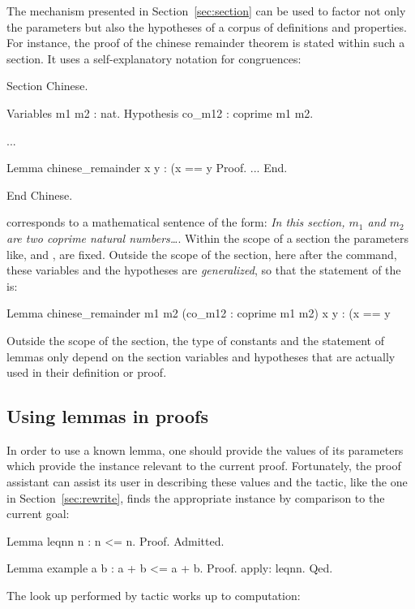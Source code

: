 The  mechanism presented in Section~\ref{sec:section} can
be used to factor not only the parameters but also the hypotheses of a
corpus of definitions and properties. For instance, the proof of the
chinese remainder theorem is stated within such a section. It uses a
self-explanatory notation for congruences:

\begin{coq}{}{}
Section Chinese.

Variables m1 m2 : nat.
Hypothesis co_m12 : coprime m1 m2.

...

Lemma chinese_remainder x y :
  (x == y %
Proof.
...
End.

End Chinese.
\end{coq}
corresponds to a mathematical sentence of the form: \emph{In this section,
  $m_1$ and $m_2$ are two coprime natural numbers\dots}. Within the
scope of a section the parameters like,  and , are
fixed. Outside the scope of the section, here after the
 command, these variables and the hypotheses are
\emph{generalized}, so that the statement of the  is:

\begin{coq}{}{}
Lemma chinese_remainder m1 m2 (co_m12 : coprime m1 m2) x y :
  (x == y %
\end{coq}

Outside the scope of the section, the type of constants and the
statement of lemmas only depend on the section variables and
hypotheses that are actually used in their definition or proof.



\subsection{Using lemmas in proofs}
\label{sec:quantifiedst}

In order to use a known lemma, one should provide the values of its
parameters which provide the instance relevant to the current
proof. Fortunately, the proof assistant can assist its user in
describing these values and the  tactic, like the
 one in Section~\ref{sec:rewrite}, finds the appropriate
instance by comparison to the current goal:

\begin{coq}{}{}
Lemma leqnn n : n <= n. Proof. Admitted.

Lemma example a b : a + b <= a + b.
Proof. apply: leqnn. Qed.
\end{coq}
The look up performed by  tactic works up to computation:

